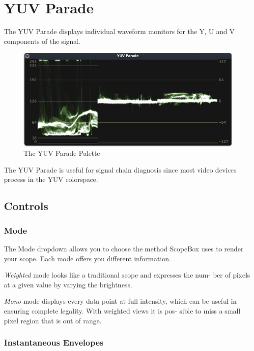 \documentclass[10,letterpaper,]{report}
\begin{document}
\chapter{YUV Parade}

The YUV Parade displays individual waveform monitors for the Y, U and V
components of the signal.

\begin{figure}[htbp]
\centering
\includegraphics{images/YUVParade.png}
\caption{The YUV Parade Palette}
\end{figure}

The YUV Parade is useful for signal chain diagnosis since most video
devices process in the YUV colorspace.

\section{Controls}

\subsection{Mode}

The Mode dropdown allows you to choose the method ScopeBox uses to
render your scope. Each mode offers you different information.

\emph{Weighted} mode looks like a traditional scope and expresses the
num- ber of pixels at a given value by varying the brightness.

\emph{Mono} mode displays every data point at full intensity, which can
be useful in ensuring complete legality. With weighted views it is pos-
sible to miss a small pixel region that is out of range.

\subsection{Instantaneous Envelopes}
\end{document}
